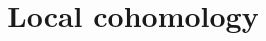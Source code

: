 \documentclass{ximera}
\title{Local cohomology}
\begin{document}
\begin{abstract}

\end{abstract}
\maketitle

\end{document}
